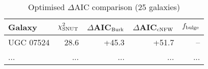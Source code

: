 
\begin{table}[h]
\caption{Optimised $\Delta$AIC comparison (25 galaxies)}
\scriptsize
\begin{tabular}{lrrrr}
Galaxy & $\chi^2_{\rm SNUT}$ & $\Delta$AIC$_{\rm Burk}$ & $\Delta$AIC$_{\rm cNFW}$ & $f_{\rm bulge}$ \\\hline
UGC 07524 & 28.6 & +45.3 & +51.7 & --\\
... & ... & ... & ... & ...\\
\end{tabular}
\end{table}
